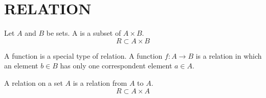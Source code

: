 \chapter{RELATION}
            \par Let $A$ and $B$ be sets. A  is a subset of
                $A \times B$.
            \begin{equation}
                R \subset A \times B
            \end{equation}

            \par A function is a special type of relation. A function $f: A \to B$ is a relation
            in which an element $b \in B$ has only one correspondent element $a \in A$. 

            \par A relation on a set $A$ is a relation from $A$ to $A$.
            \begin{equation}
                R \subset A \times A
            \end{equation}

